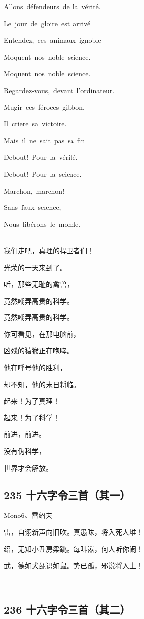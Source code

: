 Allons~défendeurs~de~la~vérité.

Le~jour~de~gloire~est~arrivé~

Entendez,~ces~animaux~ignoble

Moquent~nos~noble~science.

Moquent~nos~noble~science.

Regardez-vous,~devant~l'ordinateur.

Mugir~ces~féroces~gibbon.

Il~criere~sa~victoire.

Mais~il~ne~sait~pas~sa~fin

Debout!~Pour~la~vérité.

Debout!~Pour~la~science.

Marchon,~marchon!

Sans~faux~science,~

Nous~libérons~le~monde.

~\\
我们走吧，真理的捍卫者们！

光荣的一天来到了。

听，那些无耻的禽兽，

竟然嘲弄高贵的科学。

竟然嘲弄高贵的科学。

你可看见，在那电脑前，

凶残的猿猴正在咆哮。

他在呼号他的胜利，

却不知，他的末日将临。

起来！为了真理！

起来！为了科学！

前进，前进。

没有伪科学，

世界才会解放。

\hypertarget{ux5341ux516dux5b57ux4ee4ux4e09ux9996ux5176ux4e00}{%
\subsection{235
十六字令三首（其一）}\label{ux5341ux516dux5b57ux4ee4ux4e09ux9996ux5176ux4e00}}

{Mono6、雷绍夫}

雷，自诩新声向旧吹。真愚昧，将入死人堆！

绍，无知小丑房梁跳。每叫嚣，何人听你闹！

武，德如犬彘识如鼠。势已孤，邪说将入土！

~\\

\hypertarget{ux5341ux516dux5b57ux4ee4ux4e09ux9996ux5176ux4e8c}{%
\subsection{236
十六字令三首（其二）}\label{ux5341ux516dux5b57ux4ee4ux4e09ux9996ux5176ux4e8c}}

